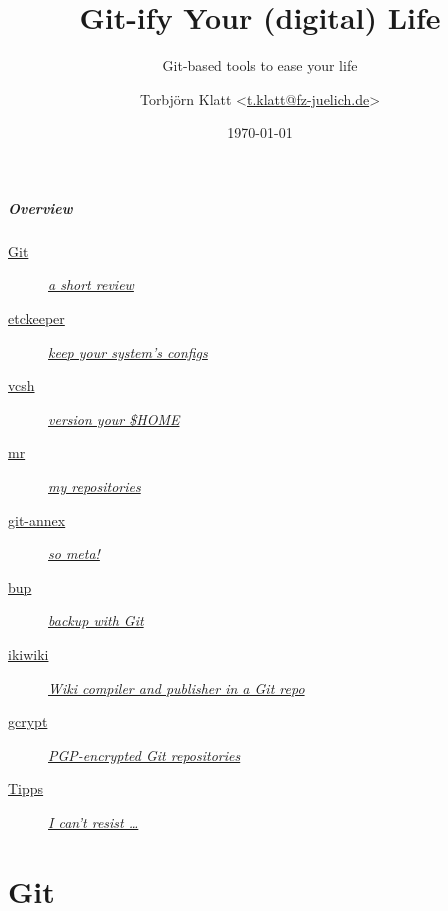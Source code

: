 \documentclass[english,hyperref={pdfpagelabels=false},aspectratio=169]{beamer}
\title{Git-ify Your (digital) Life}
\subtitle{Git-based tools to ease your life}
\author{Torbjörn Klatt <\href{mailto:t.klatt@fz-juelich.de}{t.klatt@fz-juelich.de}>}
\institute{JSC Internal Seminar}
\date{\today}
\begin{document}
\maketitle

\begin{frame}
  \frametitle{Overview}
  \begin{description}
    \item[\hyperlink{git}{Git}] \hyperlink{git}{\textit{a short review}}
    \item[\hyperlink{etckeeper}{etckeeper}] \hyperlink{etckeeper}{\textit{keep your system's configs}}
    \item[\hyperlink{vcsh}{vcsh}] \hyperlink{vcsh}{\textit{version your \$HOME}}
    \item[\hyperlink{mr}{mr}] \hyperlink{mr}{\textit{my repositories}}
    \item[\hyperlink{gitannex}{git-annex}] \hyperlink{gitannex}{\textit{so meta!}}
    \item[\hyperlink{bup}{bup}] \hyperlink{bup}{\textit{backup with Git}}
    \item[\hyperlink{ikiwiki}{ikiwiki}] \hyperlink{ikiwiki}{\textit{Wiki compiler and publisher in a Git repo}}
    \item[\hyperlink{gcrypt}{gcrypt}] \hyperlink{gcrypt}{\textit{PGP-encrypted Git repositories}}
    \item[\hyperlink{tipps}{Tipps}] \hyperlink{tipps}{\textit{I can't resist \dots}}
  \end{description}
\end{frame}


\part{Git}
\makepart
\end{document}
